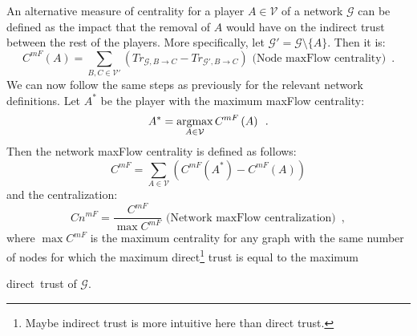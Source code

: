     An alternative measure of centrality for a player $A \in \mathcal{V}$ of a network $\mathcal{G}$ can be defined as the
    impact that the removal of $A$ would have on the indirect trust between the rest of the players. More specifically, let
    $\mathcal{G}' = \mathcal{G} \setminus \{A\}$. Then it is:
    \begin{equation*}
      C^{mF}\left(A\right) = \sum\limits_{B,C \in \mathcal{V}'}\left(Tr_{\mathcal{G}, B \rightarrow C} - Tr_{\mathcal{G}', B
      \rightarrow C}\right) \mbox{ (Node maxFlow centrality)} \enspace.
    \end{equation*}
    We can now follow the same steps as previously for the relevant network definitions. Let $A^*$ be the player with the
    maximum maxFlow centrality:
    \begin{equation*}
      A^* = \operatorname*{argmax}\limits_{A \in \mathcal{V}}C^{mF}\left(A\right) \enspace.
    \end{equation*}
    Then the network maxFlow centrality is defined as follows:
    \begin{equation*}
      C^{mF} = \sum\limits_{A \in \mathcal{V}}\left(C^{mF}\left(A^*\right) - C^{mF}\left(A\right)\right)
    \end{equation*}
    and the centralization:
    \begin{equation*}
      Cn^{mF} = \frac{C^{mF}}{\max C^{mF}} \mbox{ (Network maxFlow centralization)} \enspace,
    \end{equation*}
    where $\max C^{mF}$ is the maximum centrality for any graph with the same number of nodes for which the maximum
    direct\footnote{Maybe indirect trust is more intuitive here than direct trust.} trust is equal to the maximum
    \addtocounter{footnote}{-1} direct\footnotemark \ trust of $\mathcal{G}$.

    \noindent\hrulefill
    \newpage
